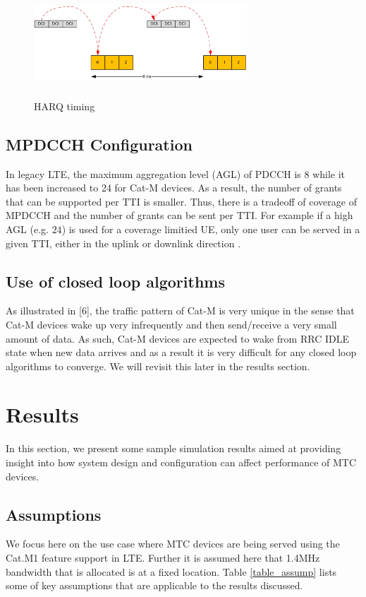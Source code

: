\documentclass[conference,compsoc]{IEEEtran}
\begin{document}
\begin{figure}[htbp]
\centerline{\includegraphics[height=40mm,width=80mm]{harq_timing.png}}
\caption{HARQ timing}
\label{fig_harq_timing}
\end{figure}


\subsection{MPDCCH Configuration}
In legacy LTE, the maximum aggregation level (AGL) of PDCCH is 8 while it has been increased to 24 for Cat-M devices. As a result, the number of grants that can be supported per TTI is smaller. Thus, there is a tradeoff of coverage of MPDCCH and the number of grants can be sent per TTI. For example if a high AGL (e.g. $24$) is used for a coverage limitied UE, only one user can be served in a given TTI, either in the uplink or downlink direction  .

\subsection{Use of closed loop algorithms}
As illustrated in [6], the traffic pattern of Cat-M is very unique in the sense that Cat-M devices wake up very infrequently and then send/receive a very small amount of data. As such, Cat-M devices are expected to wake from RRC IDLE state when new data arrives and as a result it is very difficult for any closed loop algorithms to converge. We will revisit this later in the results section. 

\section{Results}
	In this section, we present some sample simulation results aimed at providing insight into how system design and configuration can affect performance of MTC devices.

\subsection{Assumptions}
We focus here on the use case where MTC devices are being served using the Cat.M1 feature support in LTE. Further it is assumed here that 1.4MHz bandwidth that is allocated is at a fixed location. Table \ref{table_assump} lists some of key assumptions that are applicable to the results discussed.
\end{document}
